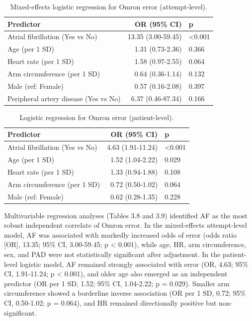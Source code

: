 \documentclass[
  12pt,
  letterpaper,
  openany,
  oneside]{book}
\begin{document}
\begin{table}
\caption{Mixed-effects logistic regression for Omron error (attempt-level).}\tabularnewline

\fontsize{12.0pt}{14.0pt}\selectfont
\begin{tabular*}{\linewidth}{@{\extracolsep{\fill}}lrl}
\toprule
{\bfseries Predictor} & {\bfseries OR (95\% CI)} & {\bfseries p} \\ 
\midrule\addlinespace[2.5pt]
Atrial fibrillation (Yes vs No) & 13.35 (3.00-59.45) & <0.001 \\ 
Age (per 1 SD) & 1.31 (0.73-2.36) & 0.366 \\ 
Heart rate (per 1 SD) & 1.58 (0.97-2.55) & 0.064 \\ 
Arm circumference (per 1 SD) & 0.64 (0.36-1.14) & 0.132 \\ 
Male (ref: Female) & 0.57 (0.16-2.08) & 0.397 \\ 
Peripheral artery disease (Yes vs No) & 6.37 (0.46-87.34) & 0.166 \\ 
\bottomrule
\end{tabular*}
\end{table}

\begin{table}
\caption{Logistic regression for Omron error (patient-level).}\tabularnewline

\fontsize{12.0pt}{14.0pt}\selectfont
\begin{tabular*}{\linewidth}{@{\extracolsep{\fill}}lrl}
\toprule
{\bfseries Predictor} & {\bfseries OR (95\% CI)} & {\bfseries p} \\ 
\midrule\addlinespace[2.5pt]
Atrial fibrillation (Yes vs No) & 4.63 (1.91-11.24) & <0.001 \\ 
Age (per 1 SD) & 1.52 (1.04-2.22) & 0.029 \\ 
Heart rate (per 1 SD) & 1.33 (0.94-1.88) & 0.108 \\ 
Arm circumference (per 1 SD) & 0.72 (0.50-1.02) & 0.064 \\ 
Male (ref: Female) & 0.62 (0.28-1.35) & 0.228 \\ 
\bottomrule
\end{tabular*}
\end{table}

Multivariable regression analyses (Tables 3.8 and 3.9) identified AF as
the most robust independent correlate of Omron error. In the
mixed-effects attempt-level model, AF was associated with markedly
increased odds of error (odds ratio {[}OR{]}, 13.35; 95\% CI,
3.00-59.45; p \textless{} 0.001), while age, HR, arm circumference, sex,
and PAD were not statistically significant after adjustment. In the
patient-level logistic model, AF remained strongly associated with error
(OR, 4.63; 95\% CI, 1.91-11.24; p \textless{} 0.001), and older age also
emerged as an independent predictor (OR per 1 SD, 1.52; 95\% CI,
1.04-2.22; p = 0.029). Smaller arm circumference showed a borderline
inverse association (OR per 1 SD, 0.72; 95\% CI, 0.50-1.02; p = 0.064),
and HR remained directionally positive but non-significant.
\end{document}
